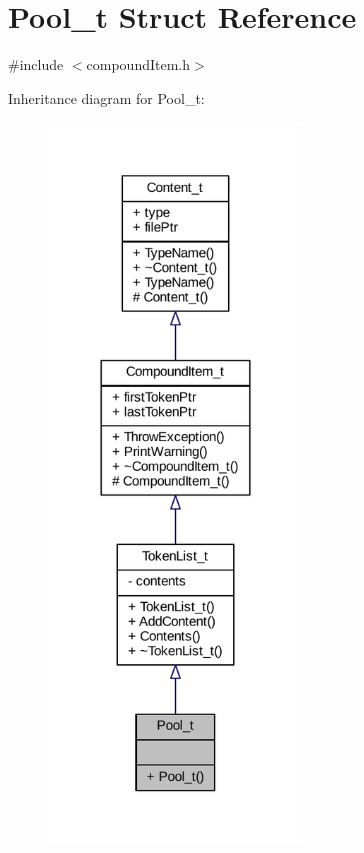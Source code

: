 \hypertarget{struct_pool__t}{}\section{Pool\+\_\+t Struct Reference}
\label{struct_pool__t}


{\ttfamily \#include $<$compound\+Item.\+h$>$}



Inheritance diagram for Pool\+\_\+t\+:
\nopagebreak
\begin{figure}[H]
\begin{center}
\leavevmode
\includegraphics[width=191pt]{struct_pool__t__inherit__graph}
\end{center}
\end{figure}


